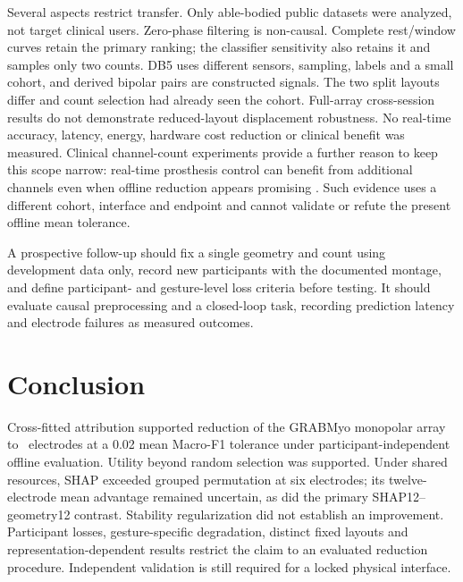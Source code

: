 Several aspects restrict transfer. Only able-bodied public datasets were analyzed, not target clinical users. Zero-phase filtering is non-causal. Complete rest/window curves retain the primary ranking; the classifier sensitivity also retains it and samples only two counts. DB5 uses different sensors, sampling, labels and a small cohort, and derived bipolar pairs are constructed signals. The two split layouts differ and count selection had already seen the cohort. Full-array cross-session results do not demonstrate reduced-layout displacement robustness. No real-time accuracy, latency, energy, hardware cost reduction or clinical benefit was measured. Clinical channel-count experiments provide a further reason to keep this scope narrow: real-time prosthesis control can benefit from additional channels even when offline reduction appears promising \citep{simon2024implications}. Such evidence uses a different cohort, interface and endpoint and cannot validate or refute the present offline mean tolerance.

A prospective follow-up should fix a single geometry and count using development data only, record new participants with the documented montage, and define participant- and gesture-level loss criteria before testing. It should evaluate causal preprocessing and a closed-loop task, recording prediction latency and electrode failures as measured outcomes.

\section{Conclusion}
Cross-fitted attribution supported reduction of the GRABMyo monopolar array to \KStarMarginPtTwo\ electrodes at a 0.02 mean Macro-F1 tolerance under participant-independent offline evaluation. Utility beyond random selection was supported. Under shared resources, SHAP exceeded grouped permutation at six electrodes; its twelve-electrode mean advantage remained uncertain, as did the primary SHAP12--geometry12 contrast. Stability regularization did not establish an improvement. Participant losses, gesture-specific degradation, distinct fixed layouts and representation-dependent results restrict the claim to an evaluated reduction procedure. Independent validation is still required for a locked physical interface.
